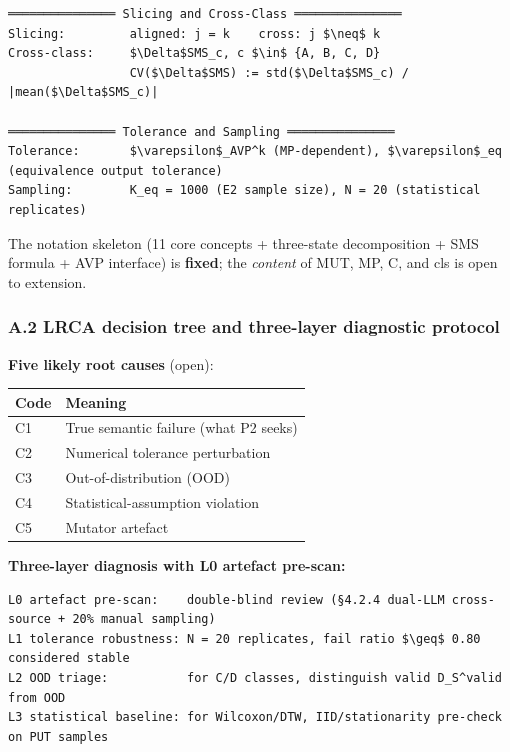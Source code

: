 \documentclass[review,12pt,authoryear]{elsarticle}
\newcounter{none}                   %
\begin{document}
\begin{verbatim}
═══════════════ Slicing and Cross-Class ═══════════════
Slicing:         aligned: j = k    cross: j $\neq$ k
Cross-class:     $\Delta$SMS_c, c $\in$ {A, B, C, D}
                 CV($\Delta$SMS) := std($\Delta$SMS_c) / |mean($\Delta$SMS_c)|

═══════════════ Tolerance and Sampling ═══════════════
Tolerance:       $\varepsilon$_AVP^k (MP-dependent), $\varepsilon$_eq (equivalence output tolerance)
Sampling:        K_eq = 1000 (E2 sample size), N = 20 (statistical replicates)
\end{verbatim}

The notation skeleton (11 core concepts + three-state decomposition +
SMS formula + AVP interface) is \textbf{fixed}; the \emph{content} of
MUT, MP, C, and cls is open to extension.

\subsubsection{A.2 LRCA decision tree and three-layer diagnostic
protocol}\label{a.2-lrca-decision-tree-and-three-layer-diagnostic-protocol}

\textbf{Five likely root causes} (open):

{\def\LTcaptype{none} %
\begin{longtable}[]{@{}ll@{}}
\toprule\noalign{}
Code & Meaning \\
\midrule\noalign{}
\endhead
\bottomrule\noalign{}
\endlastfoot
C1 & True semantic failure (what P2 seeks) \\
C2 & Numerical tolerance perturbation \\
C3 & Out-of-distribution (OOD) \\
C4 & Statistical-assumption violation \\
C5 & Mutator artefact \\
\end{longtable}
}

\textbf{Three-layer diagnosis with L0 artefact pre-scan:}

\begin{verbatim}
L0 artefact pre-scan:    double-blind review (§4.2.4 dual-LLM cross-source + 20% manual sampling)
L1 tolerance robustness: N = 20 replicates, fail ratio $\geq$ 0.80 considered stable
L2 OOD triage:           for C/D classes, distinguish valid D_S^valid from OOD
L3 statistical baseline: for Wilcoxon/DTW, IID/stationarity pre-check on PUT samples
\end{verbatim}
\end{document}
